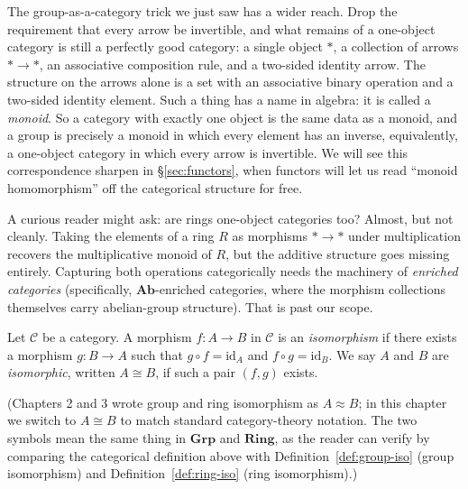 \begin{remark}
The group-as-a-category trick we just saw has a wider reach. Drop the
requirement that every arrow be invertible, and what remains of a one-object
category is still a perfectly good category: a single object $*$, a collection
of arrows $* \to *$, an associative composition rule, and a two-sided identity
arrow. The structure on the arrows alone is a set with an associative binary
operation and a two-sided identity element. Such a thing has a name in algebra:
it is called a \textit{monoid}. So a category with exactly one object is the
same data as a monoid, and a group is precisely a monoid in which every element
has an inverse, equivalently, a one-object category in which every arrow is
invertible. We will see this correspondence sharpen in \S\ref{sec:functors}, when functors
will let us read ``monoid homomorphism'' off the categorical structure for free.
\end{remark}

\noindent A curious reader might ask: are rings one-object categories too? Almost,
but not cleanly. Taking the elements of a ring $R$ as morphisms $* \to *$ under
multiplication recovers the multiplicative monoid of $R$, but the additive
structure goes missing entirely. Capturing both operations categorically needs
the machinery of \textit{enriched categories} (specifically,
$\mathbf{Ab}$-enriched categories, where the morphism collections themselves
carry abelian-group structure). That is past our scope.

\begin{definition}\label{def:cat-iso}
Let $\mathcal{C}$ be a category. A morphism $f : A \to B$ in $\mathcal{C}$ is an
\textit{isomorphism}
if there exists a morphism $g : B \to A$ such that
$g \circ f = \mathrm{id}_A$ and $f \circ g = \mathrm{id}_B$. We say $A$ and $B$
are \textit{isomorphic}, written $A \cong B$, if such a pair $(f, g)$ exists.
\end{definition}

\noindent (Chapters 2 and 3 wrote group and ring isomorphism as $A \approx B$;
in this chapter we switch to $A \cong B$ to match standard category-theory
notation. The two symbols mean the same thing in $\mathbf{Grp}$ and
$\mathbf{Ring}$, as the reader can verify by comparing the categorical
definition above with Definition~\ref{def:group-iso} (group isomorphism) and
Definition~\ref{def:ring-iso} (ring isomorphism).)

